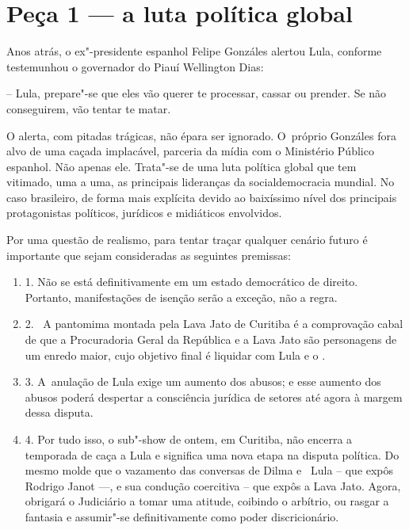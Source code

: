 

\section{Peça 1 --- a luta política global}

Anos atrás, o ex"-presidente espanhol Felipe Gonzáles alertou Lula,
conforme testemunhou o governador do Piauí Wellington Dias:

-- Lula, prepare"-se que eles vão querer te processar, cassar ou prender.
Se não conseguirem, vão tentar te matar.

O alerta, com pitadas trágicas, não épara ser ignorado. O~próprio
Gonzáles fora alvo de uma caçada implacável, parceria da mídia com o
Ministério Público espanhol. Não apenas ele. Trata"-se de uma luta
política global que tem vitimado, uma a uma, as principais lideranças da
socialdemocracia mundial. No caso brasileiro, de forma mais explícita
devido ao baixíssimo nível dos principais protagonistas políticos,
jurídicos e midiáticos envolvidos.

Por uma questão de realismo, para tentar traçar qualquer cenário futuro
é importante que sejam consideradas as seguintes premissas:

\begin{enumerate}
\itemsep1pt\parskip0pt
\item
  1. Não se está definitivamente em um estado democrático de direito.
  Portanto, manifestações de isenção serão a exceção, não a regra.
\item
  2.~ A pantomima montada pela Lava Jato de Curitiba é a comprovação
  cabal de que a Procuradoria Geral da República e a Lava Jato são
  personagens de um enredo maior, cujo objetivo final é liquidar com
  Lula e o .
\item
  3. A~anulação de Lula exige um aumento dos abusos; e esse aumento dos
  abusos poderá despertar a consciência jurídica de setores até agora à
  margem dessa disputa.
\item
  4. Por tudo isso, o sub"-show de ontem, em Curitiba, não encerra a
  temporada de caça a Lula e significa uma nova etapa na disputa
  política. Do mesmo molde que o vazamento das conversas de Dilma e~
  Lula -- que expôs Rodrigo Janot \mbox{---,} e sua condução coercitiva -- que
  expôs a Lava Jato. Agora, obrigará o Judiciário a tomar uma atitude,
  coibindo o arbítrio, ou rasgar a fantasia e assumir"-se definitivamente
  como poder discricionário.
\end{enumerate}

